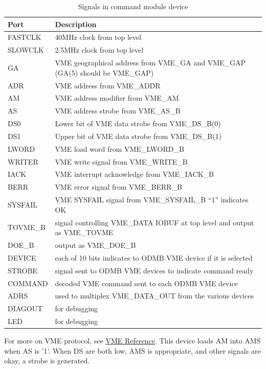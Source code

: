 \documentclass[10pt,a4paper]{article}
\begin{document}
\begin{table}[H]
\begin{tabular}{|l|l|} \hline
Port& Description\\ \hline
FASTCLK& 40MHz clock from top level\\ \hline
SLOWCLK& 2.5MHz clock from top level\\ \hline
GA& VME geographical address from VME\_GA and VME\_GAP (GA(5) should be VME\_GAP)\\ \hline
ADR& VME address from VME\_ADDR\\ \hline
AM& VME address modifier from VME\_AM\\ \hline
AS& VME address strobe from VME\_AS\_B\\ \hline
DS0& Lower bit of VME data strobe from VME\_DS\_B(0)\\ \hline
DS1& Upper bit of VME data strobe from VME\_DS\_B(1)\\ \hline
LWORD& VME load word from VME\_LWORD\_B\\ \hline
WRITER& VME write signal from VME\_WRITE\_B\\ \hline
IACK& VME interrupt acknowledge from VME\_IACK\_B\\ \hline
BERR& VME error signal from VME\_BERR\_B\\ \hline
SYSFAIL& VME SYSFAIL signal from VME\_SYSFAIL\_B ``1'' indicates OK\\ \hline
TOVME\_B& signal controlling VME\_DATA IOBUF at top level and output as VME\_TOVME\\ \hline
DOE\_B& output as VME\_DOE\_B\\ \hline
DEVICE& each of 10 bits indicates to ODMB VME device if it is selected\\ \hline
STROBE& signal sent to ODMB VME devices to indicate command ready\\ \hline
COMMAND& decoded VME command sent to each ODMB VME device\\ \hline
ADRS& used to multiplex VME\_DATA\_OUT from the various devices\\ \hline
DIAGOUT& for debugging\\ \hline
LED& for debugging\\ \hline
\end{tabular}
\caption{Signals in command module device}
\label{tab:commandinterface}
\end{table}

For more on VME protocol, see \href{http://www.interfacebus.com/Design_Connector_VME.html}{VME Reference}. This device loads AM into AMS when AS is '1'. When DS are both low, AMS is appropriate, and other signals are okay, a strobe is generated.
\end{document}
